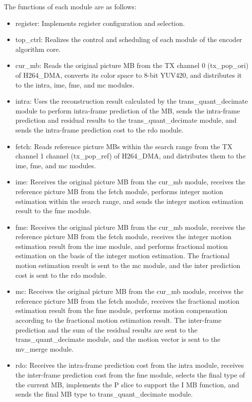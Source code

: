 \documentclass[main\_\_EN.tex]{subfiles}
\begin{document}
The functions of each module are as follows:
\begin{itemize}
    \item register: Implements register configuration and selection.
    \item top\_ctrl: Realizes the control and scheduling of each module of the encoder algorithm core.
    \item cur\_mb: Reads the original picture MB from the TX channel 0 (tx\_pop\_ori) of H264\_DMA, converts its color space to 8-bit YUV420, and distributes it to the intra, ime, fme, and mc modules.
    \item intra: Uses the reconstruction result calculated by the trans\_quant\_decimate module to perform intra-frame prediction of the MB, sends the intra-frame prediction and residual results to the trans\_quant\_decimate module, and sends the intra-frame prediction cost to the rdo module.
    \item fetch: Reads reference picture MBs within the search range from the TX channel 1 channel (tx\_pop\_ref) of H264\_DMA, and distributes them to the ime, fme, and mc modules.
    \item ime: Receives the original picture MB from the cur\_mb module, receives the reference picture MB from the fetch module, performs integer motion estimation within the search range, and sends the integer motion estimation result to the fme module.
    \item fme: Receives the original picture MB from the cur\_mb module, receives the reference picture MB from the fetch module, receives the integer motion estimation result from the ime module, and performs fractional motion estimation on the basis of the integer motion estimation. The fractional motion estimation result is sent to the mc module, and the inter prediction cost is sent to the rdo module.
    \item mc: Receives the original picture MB from the cur\_mb module, receives the reference picture MB from the fetch module, receives the fractional motion estimation result from the fme module, performs motion compensation according to the fractional motion estimation result. The inter-frame prediction and the sum of the residual results are sent to the trans\_quant\_decimate module, and the motion vector is sent to the mv\_merge module.
    \item rdo: Receives the intra-frame prediction cost from the intra module, receives the inter-frame prediction cost from the fme module, selects the final type of the current MB, implements the P slice to support the I MB function, and sends the final MB type to trans\_quant\_decimate module.


\end{itemize}
\end{document}
